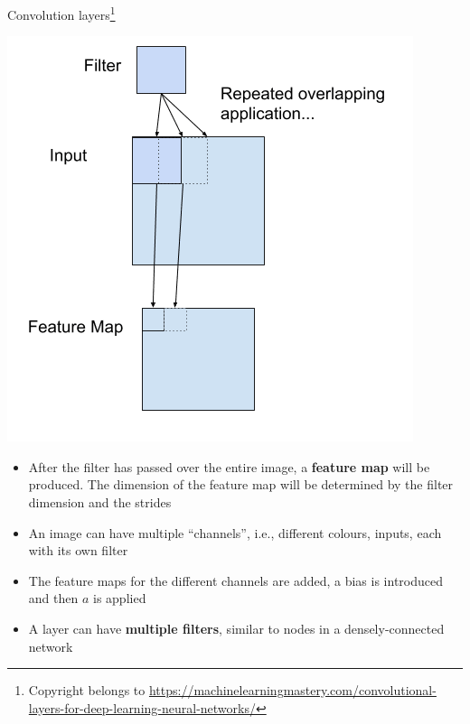 \documentclass{beamer}
\begin{document}
\begin{frame}{Convolution layers\footnote{Copyright belongs to \url{https://machinelearningmastery.com/convolutional-layers-for-deep-learning-neural-networks/}}}
\begin{minipage}{0.39\linewidth}
\includegraphics[width=\textwidth]{Images/cfilter.png}
\end{minipage}
\begin{minipage}{0.59\linewidth}
\begin{itemize}
\item After the filter has passed over the entire image, a \textbf{feature map} will be produced. The dimension of the feature map will be determined by the filter dimension and the strides
\item An image can have multiple ``channels'', i.e., different colours, inputs, each with its own filter
\item The feature maps for the different channels are added, a bias is introduced and then $a$ is applied 
\item A layer can have \textbf{multiple filters}, similar to nodes in a densely-connected network
\end{itemize}
\end{minipage}
\end{frame}
\end{document}
